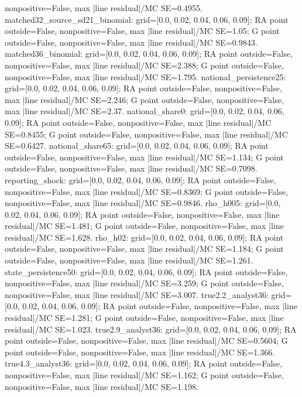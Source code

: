\begin{table}[htbp]
\begin{minipage}{\linewidth}
nonpositive=False, max |line residual|/MC SE=0.4955. matched32\_\allowbreak{}source\_\allowbreak{}sd21\_\allowbreak{}binomial: grid=[0.0, 0.02, 0.04, 0.06, 0.09]; RA point outside=False, nonpositive=False, max |line residual|/MC SE=1.05; G point outside=False, nonpositive=False, max |line residual|/MC SE=0.9843. matched36\_\allowbreak{}binomial: grid=[0.0, 0.02, 0.04, 0.06, 0.09]; RA point outside=False, nonpositive=False, max |line residual|/MC SE=2.388; G point outside=False, nonpositive=False, max |line residual|/MC SE=1.795. national\_\allowbreak{}persistence25: grid=[0.0, 0.02, 0.04, 0.06, 0.09]; RA point outside=False, nonpositive=False, max |line residual|/MC SE=2.246; G point outside=False, nonpositive=False, max |line residual|/MC SE=2.37. national\_\allowbreak{}share0: grid=[0.0, 0.02, 0.04, 0.06, 0.09]; RA point outside=False, nonpositive=False, max |line residual|/MC SE=0.8455; G point outside=False, nonpositive=False, max |line residual|/MC SE=0.6427. national\_\allowbreak{}share65: grid=[0.0, 0.02, 0.04, 0.06, 0.09]; RA point outside=False, nonpositive=False, max |line residual|/MC SE=1.134; G point outside=False, nonpositive=False, max |line residual|/MC SE=0.7098. reporting\_\allowbreak{}shock: grid=[0.0, 0.02, 0.04, 0.06, 0.09]; RA point outside=False, nonpositive=False, max |line residual|/MC SE=0.8369; G point outside=False, nonpositive=False, max |line residual|/MC SE=0.9846. rho\_\allowbreak{}h005: grid=[0.0, 0.02, 0.04, 0.06, 0.09]; RA point outside=False, nonpositive=False, max |line residual|/MC SE=1.481; G point outside=False, nonpositive=False, max |line residual|/MC SE=1.628. rho\_\allowbreak{}h02: grid=[0.0, 0.02, 0.04, 0.06, 0.09]; RA point outside=False, nonpositive=False, max |line residual|/MC SE=1.184; G point outside=False, nonpositive=False, max |line residual|/MC SE=1.261. state\_\allowbreak{}persistence50: grid=[0.0, 0.02, 0.04, 0.06, 0.09]; RA point outside=False, nonpositive=False, max |line residual|/MC SE=3.259; G point outside=False, nonpositive=False, max |line residual|/MC SE=3.007. true2.2\_\allowbreak{}analyst36: grid=[0.0, 0.02, 0.04, 0.06, 0.09]; RA point outside=False, nonpositive=False, max |line residual|/MC SE=1.281; G point outside=False, nonpositive=False, max |line residual|/MC SE=1.023. true2.9\_\allowbreak{}analyst36: grid=[0.0, 0.02, 0.04, 0.06, 0.09]; RA point outside=False, nonpositive=False, max |line residual|/MC SE=0.5604; G point outside=False, nonpositive=False, max |line residual|/MC SE=1.366. true4.3\_\allowbreak{}analyst36: grid=[0.0, 0.02, 0.04, 0.06, 0.09]; RA point outside=False, nonpositive=False, max |line residual|/MC SE=1.162; G point outside=False, nonpositive=False, max |line residual|/MC SE=1.198.
\end{minipage}
\end{table}
